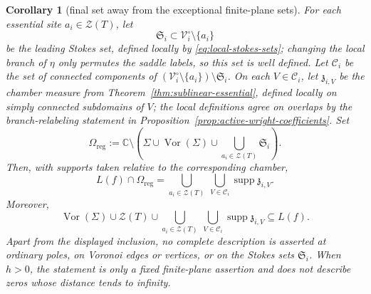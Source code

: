 \documentclass[reqno]{article}
\newtheorem{cor}[theorem]{Corollary}
\theoremstyle{definition}
\theoremstyle{remark}
\theoremstyle{plain}
\newcommand{\Z}{\mathcal Z}
\begin{document}
\begin{cor}[final set away from the exceptional finite-plane sets]\label{cor:regular-final-set}
For each essential site $a_i\in\Z(T)$, let
\[
\mathfrak S_i\subset\mathcal V_i^\circ\setminus\{a_i\}
\]
be the leading Stokes set, defined locally by \eqref{eq:local-stokes-sets}; changing the local branch of $\eta$ only permutes the saddle labels, so this set is well defined. Let $\mathcal C_i$ be the set of connected components of $(\mathcal V_i^\circ\setminus\{a_i\})\setminus\mathfrak S_i$. On each $V\in\mathcal C_i$, let $\mathfrak z_{i,V}$ be the chamber measure from Theorem~\ref{thm:sublinear-essential}, defined locally on simply connected subdomains of $V$; the local definitions agree on overlaps by the branch-relabeling statement in Proposition~\ref{prop:active-wright-coefficients}. Set
\[
\Omega_{\mathrm{reg}}
:=
\mathbb C\setminus
\left(
\Sigma\cup \operatorname{Vor}(\Sigma)\cup
\bigcup_{a_i\in\Z(T)}\mathfrak S_i
\right).
\]
Then, with supports taken relative to the corresponding chamber,
\[
L(f)\cap\Omega_{\mathrm{reg}}
=
\bigcup_{a_i\in\Z(T)}
\ \bigcup_{V\in\mathcal C_i}
\operatorname{supp}\mathfrak z_{i,V}.
\]
Moreover,
\[
\operatorname{Vor}(\Sigma)\cup\Z(T)\cup
\bigcup_{a_i\in\Z(T)}
\ \bigcup_{V\in\mathcal C_i}
\operatorname{supp}\mathfrak z_{i,V}
\subseteq L(f).
\]
Apart from the displayed inclusion, no complete description is asserted at ordinary poles, on Voronoi edges or vertices, or on the Stokes sets \(\mathfrak S_i\). When \(h>0\), the statement is only a fixed finite-plane assertion and does not describe zeros whose distance tends to infinity.
\end{cor}
\end{document}

